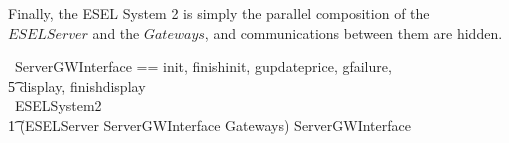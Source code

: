 Finally, the ESEL System 2 is simply the parallel composition of the $ESELServer$ and the $Gateways$, and communications between them are hidden.
\begin{circus}
    \circchannelset\ ServerGWInterface == \lchanset init, finishinit, gupdateprice, gfailure, \\
                \t5 display, finishdisplay \rchanset \\
    \circprocess\ ESELSystem2 \circdef \\
        \t1 (ESELServer \lpar ServerGWInterface \rpar Gateways) \circhide ServerGWInterface 
\end{circus}
